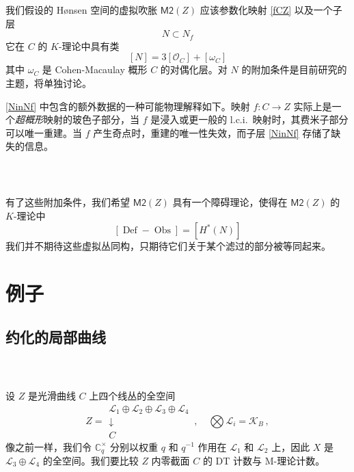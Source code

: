 \documentclass[12pt]{article}
\newcommand{\cO}{\mathscr{O}}
\newcommand{\cL}{\mathscr{L}}
\DeclareMathOperator{\Def}{Def}
\DeclareMathOperator{\Obs}{Obs}
\newcommand{\Ct}{\mathbb{C}^{\times}}
\newcommand{\Cq}{\Ct_q}
\newcommand{\MM}{\textsf{M2}}
\newcommand{\cK}{\mathscr{K}}
\theoremstyle{definition}
\begin{document}
\subsubsection{\ }

我们假设的 H{\o}nsen 空间的虚拟吹胀 $\MM(Z)$ 应该参数化映射 \eqref{fCZ} 以及一个子层
\begin{equation}
N \subset N_f\label{NinNf}
\end{equation}
它在 $C$ 的 $K$-理论中具有类
$$
[N] = 3 \left[\cO_C\right] + \left[\omega_C \right]
$$
其中 $\omega_C$ 是 Cohen-Macaulay 概形 $C$ 的对偶化层。对 $N$ 的附加条件是目前研究的主题，将单独讨论。

\eqref{NinNf} 中包含的额外数据的一种可能物理解释如下。映射 $f: C\to Z$ 实际上是一个\emph{超概形}映射的玻色子部分，当 $f$ 是浸入或更一般的 l.c.i.\ 映射时，其费米子部分可以唯一重建。当 $f$ 产生奇点时，重建的唯一性失效，而子层 \eqref{NinNf} 存储了缺失的信息。

\subsubsection{\ }

有了这些附加条件，我们希望 $\MM(Z)$ 具有一个障碍理论，使得在 $\MM(Z)$ 的 $K$-理论中
$$
\left[ \Def - \Obs \right] = \left[H^*(N)\right]
$$
我们并不期待这些虚拟丛同构，只期待它们关于某个滤过的部分被等同起来。
\section{例子}
\label{s_exa}

\subsection{约化的局部曲线}\label{s_slc}

\subsubsection{\ }

设 $Z$ 是光滑曲线 $C$ 上四个线丛的全空间
$$
Z =
\begin{matrix}
\cL_1 \oplus \cL_2 \oplus \cL_3 \oplus \cL_4 \\
\downarrow\\
C
\end{matrix} \,, \quad \bigotimes \cL_i = \cK_B \,,
$$
像之前一样，我们令 $\Cq$ 分别以权重 $q$ 和 $q^{-1}$ 作用在 $\cL_1$ 和 $\cL_2$ 上，因此 $X$ 是 $\cL_3\oplus \cL_4$ 的全空间。我们要比较 $Z$ 内零截面 $C$ 的 DT 计数与 M-理论计数。
\end{document}
